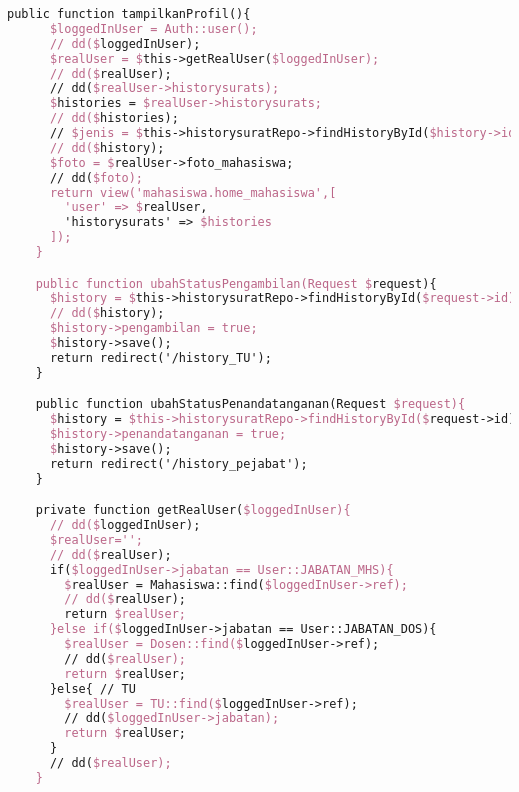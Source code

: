 \begin{lstlisting}[language=tex,basicstyle=\tiny,caption=HistorysuratController.php]
    public function tampilkanProfil(){
      $loggedInUser = Auth::user();
      // dd($loggedInUser);
      $realUser = $this->getRealUser($loggedInUser);
      // dd($realUser);
      // dd($realUser->historysurats);
      $histories = $realUser->historysurats;
      // dd($histories);
      // $jenis = $this->historysuratRepo->findHistoryById($history->id)
      // dd($history);
      $foto = $realUser->foto_mahasiswa;
      // dd($foto);
      return view('mahasiswa.home_mahasiswa',[
        'user' => $realUser,
        'historysurats' => $histories
      ]);
    }

    public function ubahStatusPengambilan(Request $request){
      $history = $this->historysuratRepo->findHistoryById($request->id);
      // dd($history);
      $history->pengambilan = true;
      $history->save();
      return redirect('/history_TU');
    }

    public function ubahStatusPenandatanganan(Request $request){
      $history = $this->historysuratRepo->findHistoryById($request->id);
      $history->penandatanganan = true;
      $history->save();
      return redirect('/history_pejabat');
    }

    private function getRealUser($loggedInUser){
      // dd($loggedInUser);
      $realUser='';
      // dd($realUser);
      if($loggedInUser->jabatan == User::JABATAN_MHS){
        $realUser = Mahasiswa::find($loggedInUser->ref);
        // dd($realUser);
        return $realUser;
      }else if($loggedInUser->jabatan == User::JABATAN_DOS){
        $realUser = Dosen::find($loggedInUser->ref);
        // dd($realUser);
        return $realUser;
      }else{ // TU
        $realUser = TU::find($loggedInUser->ref);
        // dd($loggedInUser->jabatan);
        return $realUser;
      }
      // dd($realUser);
    }


\end{lstlisting}
